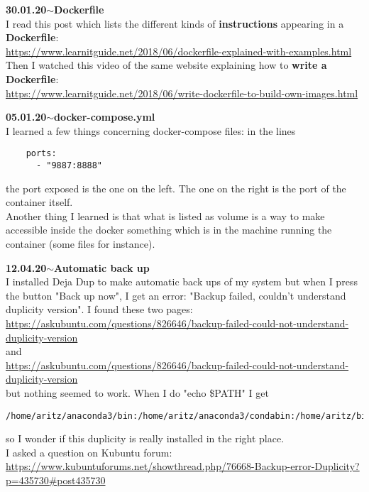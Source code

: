 \documentclass[11pt,a4paper]{article}
\newenvironment{loggentry}[2]%
{\noindent\textbf{#1}\hspace{1cm}$\mathbf{\sim}$\text{ }\textbf{#2}\\}{\vspace{0.5cm}}
\begin{document}
\begin{loggentry}{30.01.20}{Dockerfile}

I read this post which lists the different kinds of \textbf{instructions} appearing in a \textbf{Dockerfile}:\\
\url{https://www.learnitguide.net/2018/06/dockerfile-explained-with-examples.html}\\
Then I watched this video of the same website explaining how to \textbf{write a Dockerfile}:\\
\url{https://www.learnitguide.net/2018/06/write-dockerfile-to-build-own-images.html}

\end{loggentry}


\begin{loggentry}{05.01.20}{docker-compose.yml}

I learned a few things concerning docker-compose files:
in the lines
\begin{verbatim}
    ports:
      - "9887:8888"
\end{verbatim}
the port exposed is the one on the left. The one on the right is the port of the container itself.\\

Another thing I learned is that what is listed as volume is a way to make accessible inside the docker something which is in the machine running the container (some files for instance).

\end{loggentry}


\begin{loggentry}{12.04.20}{Automatic back up}

I installed Deja Dup to make automatic back ups of my system but when I press the button "Back up now", I get an error: "Backup failed, couldn't understand duplicity version". I found these two pages:\\
\url{https://askubuntu.com/questions/826646/backup-failed-could-not-understand-duplicity-version}\\
and\\
\url{https://askubuntu.com/questions/826646/backup-failed-could-not-understand-duplicity-version}\\
but nothing seemed to work. When I do "echo \$PATH" I get
\begin{verbatim}
/home/aritz/anaconda3/bin:/home/aritz/anaconda3/condabin:/home/aritz/bin:/home/aritz/.local/bin:/usr/local/sbin:/usr/local/bin:/usr/sbin:/usr/bin:/sbin:/bin:/usr/games:/usr/local/games:/snap/bin
\end{verbatim}
so I wonder if this duplicity is really installed in the right place.\\

I asked a question on Kubuntu forum:\\
\url{https://www.kubuntuforums.net/showthread.php/76668-Backup-error-Duplicity?p=435730#post435730}\\


\end{loggentry}
\end{document}
